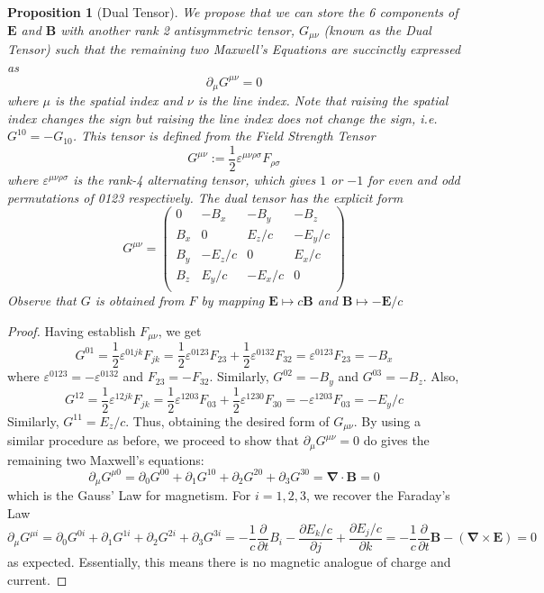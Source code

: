 \documentclass[a4paper]{article}
\theoremstyle{new}
\newtheorem{prop}{Proposition}[section]
\begin{document}
\begin{prop}[Dual Tensor]
We propose that we can store the 6 components of $\mathbf{E}$ and $\mathbf{B}$ with another rank 2 antisymmetric tensor, $G_{\mu\nu}$ (known as the Dual Tensor) such that the remaining two Maxwell's Equations are succinctly expressed as
$$\partial_\mu G^{\mu\nu}=0$$
where $\mu$ is the spatial index and $\nu$ is the line index. Note that raising the spatial index changes the sign but raising the line index does not change the sign, i.e. $G^{10}=-G_{10}$. This tensor is defined from the Field Strength Tensor
$$G^{\mu\nu}:=\frac{1}{2}\varepsilon^{\mu\nu\rho\sigma}F_{\rho\sigma}$$
where $\varepsilon^{\mu\nu\rho\sigma}$ is the rank-4 alternating tensor, which gives $1$ or $-1$ for even and odd permutations of 0123 respectively. The dual tensor has the explicit form
$$G^{\mu\nu}=\begin{pmatrix}0&-B_x&-B_y&-B_z\\B_x&0&E_z/c&-E_y/c\\B_y&-E_z/c&0&E_x/c\\B_z&E_y/c&-E_x/c&0\\\end{pmatrix}$$
Observe that $G$ is obtained from $F$ by mapping $\mathbf{E}\mapsto c\mathbf{B}$ and $\mathbf{B}\mapsto -\mathbf{E}/c$
\end{prop}
\begin{proof}
Having establish $F_{\mu\nu}$, we get
$$G^{01}=\frac{1}{2}\varepsilon^{01jk}F_{jk}=\frac{1}{2}\varepsilon^{0123}F_{23}+\frac{1}{2}\varepsilon^{0132}F_{32}=\varepsilon^{0123}F_{23}=-B_x$$
where $\varepsilon^{0123}=-\varepsilon^{0132}$ and $F_{23}=-F_{32}$. Similarly, $G^{02}=-B_y$ and $G^{03}=-B_z$. Also,
$$G^{12}=\frac{1}{2}\varepsilon^{12jk}F_{jk}=\frac{1}{2}\varepsilon^{1203}F_{03}+\frac{1}{2}\varepsilon^{1230}F_{30}=-\varepsilon^{1203}F_{03}=-E_y/c$$
Similarly, $G^{11}=E_z/c$. Thus, obtaining the desired form of $G_{\mu\nu}$. By using a similar procedure as before, we proceed to show that $\partial_\mu G^{\mu\nu}=0$ do gives the remaining two Maxwell's equations:
$$\partial_\mu G^{\mu0}=\partial_0G^{00}+\partial_1G^{10}+\partial_2G^{20}+\partial_3G^{30}=\boldsymbol{\nabla}\cdot\mathbf{B}=0$$
which is the Gauss' Law for magnetism. For $i=1,2,3$, we recover the Faraday's Law
$$\partial_\mu G^{\mu i}=\partial_0G^{0i}+\partial_1G^{1i}+\partial_2G^{2i}+\partial_3G^{3i}=-\frac{1}{c}\frac{\partial}{\partial t}B_i-\frac{\partial E_k/c}{\partial j}+\frac{\partial E_j/c}{\partial k}=-\frac{1}{c}\frac{\partial}{\partial t}\mathbf{B}-(\boldsymbol{\nabla}\times\mathbf{E})=0$$
as expected. Essentially, this means there is no magnetic analogue of charge and current.
\end{proof}
\end{document}
